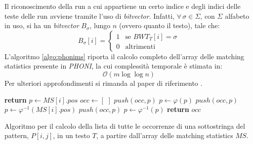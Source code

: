 Il riconoscimento della run a cui appartiene un certo indice e degli indici
delle teste delle run avviene tramite l'uso di \textit{bitvector}. Infatti,
$\forall\, \sigma \in \Sigma$, con $\Sigma$ alfabeto in uso, si ha un
\textit{bitvector} $B_{\sigma}$, lungo $n$ (ovvero quanto il testo), tale che:
\begin{equation}
  \label{eq:rlbwt10}
  B_{\sigma}[i]=
  \begin{cases}
    1&\mbox{se } BWT_T[i]=\sigma\\
    0&\mbox{altrimenti}
  \end{cases}
\end{equation}
L'algoritmo \ref{algo:phonims} \cite{phoni}
riporta il calcolo completo dell'array delle matching statistics presente in
\textit{PHONI}, la cui 
complessità temporale è stimata in:
\begin{equation}
  \label{eq:rlbwt11}
  \mathcal{O}(m\log\log n)
\end{equation}
Per ulteriori approfondimenti si rimanda al paper di riferimento
\cite{phoni}.
\begin{algorithm}
  \small
  \begin{algorithmic}[1]
    \State \textbf{return}
    \EndIf
    \State $p\gets MS[i].pos$
    \State $occ\gets [\,\,]$
    \State $push(occ, p)$
    \State $p\gets \varphi(p)$
    \State $push(occ, p)$
    \EndWhile
    \State $p\gets \varphi^{-1}(MS[i].pos)$
    \State $push(occ, p)$
    \State $p\gets \varphi^{-1}(p)$
    \EndWhile
    \State \textbf{return} $occ$
    \EndFunction
  \end{algorithmic}
  \caption{Algoritmo per il calcolo della lista di tutte le occorrenze di una
  sottostringa del pattern, $P[i,j]$, in un testo $T$, a partire dall'array
  delle matching statistics $MS$.}
  \label{algo:expand}
\end{algorithm}

